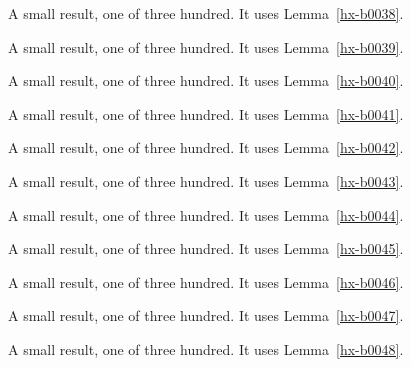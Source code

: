 \begin{lemma}[Bulk 39]\label{hx-b0039}
A small result, one of three hundred. It uses Lemma~\ref{hx-b0038}.
\end{lemma}

\begin{lemma}[Bulk 40]\label{hx-b0040}
A small result, one of three hundred. It uses Lemma~\ref{hx-b0039}.
\end{lemma}

\begin{lemma}[Bulk 41]\label{hx-b0041}
A small result, one of three hundred. It uses Lemma~\ref{hx-b0040}.
\end{lemma}

\begin{lemma}[Bulk 42]\label{hx-b0042}
A small result, one of three hundred. It uses Lemma~\ref{hx-b0041}.
\end{lemma}

\begin{lemma}[Bulk 43]\label{hx-b0043}
A small result, one of three hundred. It uses Lemma~\ref{hx-b0042}.
\end{lemma}

\begin{lemma}[Bulk 44]\label{hx-b0044}
A small result, one of three hundred. It uses Lemma~\ref{hx-b0043}.
\end{lemma}

\begin{lemma}[Bulk 45]\label{hx-b0045}
A small result, one of three hundred. It uses Lemma~\ref{hx-b0044}.
\end{lemma}

\begin{lemma}[Bulk 46]\label{hx-b0046}
A small result, one of three hundred. It uses Lemma~\ref{hx-b0045}.
\end{lemma}

\begin{lemma}[Bulk 47]\label{hx-b0047}
A small result, one of three hundred. It uses Lemma~\ref{hx-b0046}.
\end{lemma}

\begin{lemma}[Bulk 48]\label{hx-b0048}
A small result, one of three hundred. It uses Lemma~\ref{hx-b0047}.
\end{lemma}

\begin{lemma}[Bulk 49]\label{hx-b0049}
A small result, one of three hundred. It uses Lemma~\ref{hx-b0048}.
\end{lemma}

